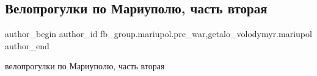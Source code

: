  
 
 
 
 

\subsection{Велопрогулки по Мариуполю, часть вторая}
\label{sec:12_03_2023.fb.fb_group.mariupol.pre_war.3.veloprogulki_po_mari}
 
\ifcmt
 author_begin
   author_id fb_group.mariupol.pre_war,getalo_volodymyr.mariupol
 author_end
\fi

велопрогулки по Мариуполю, часть вторая

